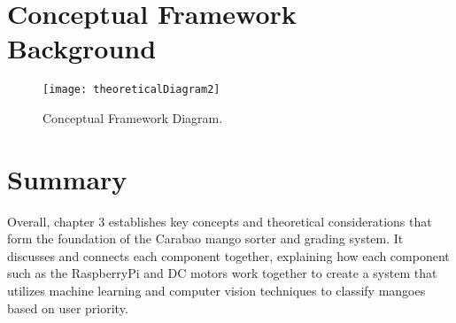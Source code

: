 \section{Conceptual Framework Background}


\begin{figure}[!htbp]
	\centering
	\texttt{[image: theoreticalDiagram2]}
	\caption{Conceptual Framework Diagram.}
	\label{fig:theoreticalDiagram2}
\end{figure}


\section{Summary}

Overall, chapter 3 establishes key concepts and theoretical considerations that form the foundation of the Carabao mango sorter and grading system. It discusses and connects each component together, explaining how each component such as the RaspberryPi and DC motors work together to create a system that utilizes machine learning and computer vision techniques to classify mangoes based on user priority.